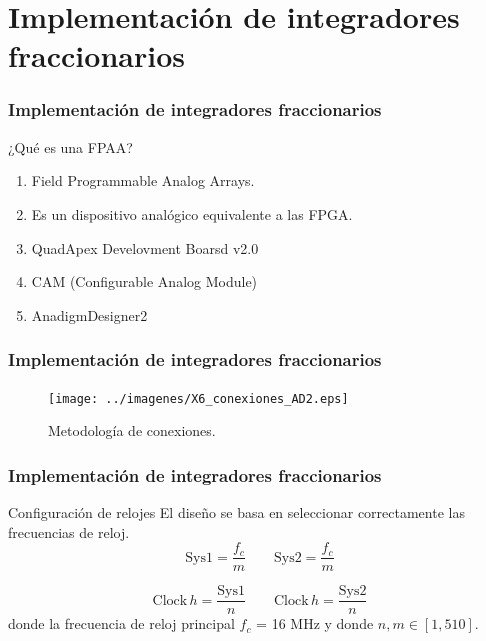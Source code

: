 \documentclass[10pt]{beamer}
\begin{document}
	\section{Implementación de integradores fraccionarios}
	\begin{frame}
		\frametitle{Implementación de integradores fraccionarios}
		\begin{block}{¿Qué es una FPAA?}
			\begin{enumerate}
				\item Field Programmable Analog Arrays.
				\item Es un dispositivo analógico equivalente a las FPGA.
				\item QuadApex Develovment Boarsd v2.0
				\item CAM (Configurable Analog Module)
				\item AnadigmDesigner2
			\end{enumerate}
		\end{block}
	\end{frame}
	\begin{frame}
		\frametitle{Implementación de integradores fraccionarios}
			\begin{figure}[hbtp]
			\caption{Metodología de conexiones.}
			\centering
			\texttt{[image: ../imagenes/X6\_conexiones\_AD2.eps]}
			\end{figure}
	\end{frame}
	\begin{frame}
		\frametitle{Implementación de integradores fraccionarios}
		\begin{block}{Configuración de relojes}
		El diseño se basa en seleccionar correctamente las frecuencias de reloj.
		\begin{equation}
			\mathrm{Sys1} = \frac{f_{c}}{m} \qquad \mathrm{Sys2} = \frac{f_{c}}{m}
			\label{ec:sys_clock}
		\end{equation}
		
		\begin{equation}
		\mathrm{Clock\,} h = \frac{\mathrm{Sys1}}{n}	\qquad   \mathrm{Clock\,} h = \frac{\mathrm{Sys2}}{n}
		\label{ec:clock_h}
		\end{equation}
		\justifying
		donde la frecuencia de reloj principal $f_{c}$ = 16 MHz y donde $n,m\in[1,510]$.
		\end{block}
	\end{frame}
\end{document}
